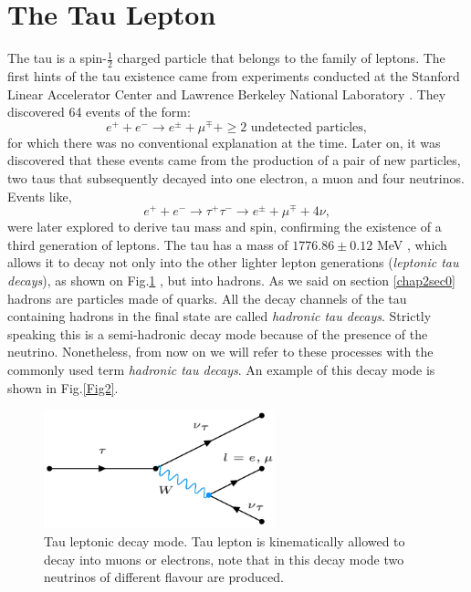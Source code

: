 \section{The Tau Lepton}\label{chap2sec1}
The tau is a spin-$\frac{1}{2}$ charged particle that belongs to the family of leptons. The first hints of the tau existence came from experiments conducted at the Stanford Linear Accelerator Center and Lawrence Berkeley National Laboratory \cite{PhysRevLett.35.1489}. They discovered 64 events of the form:
\begin{equation}
	e^+ + e^- \to e^\pm + \mu^\mp + \geq \text{2 undetected particles},
\end{equation}
for which there was no conventional explanation at the time. Later on, it was discovered that these events came from the production of a pair of new particles, two taus that subsequently decayed into one electron, a muon and four neutrinos. Events like,
\begin{equation}
e^+ + e^- \to \tau^+ \tau^- \to e^\pm + \mu^\mp + 4\nu,
\end{equation}	
were later explored to derive tau mass and spin, confirming the existence of a third generation of leptons. 
The tau has a mass of $1776.86 \pm 0.12$ MeV \cite{PhysRevD.98.030001}, which allows it to decay not only into the other lighter lepton generations (\textit{leptonic tau decays}), as shown on Fig.\ref{Fig1}  , but into hadrons. As we said on section \ref{chap2sec0} hadrons are particles made of quarks. All the decay channels of the tau containing hadrons in the final state are called \textit{hadronic tau decays}. Strictly speaking this is a semi-hadronic decay mode because of the presence of the neutrino. Nonetheless, from now on we will refer to these processes with the commonly used term \textit{hadronic tau decays}. An example of this decay mode is shown in Fig.\ref{Fig2}.
\begin{figure}[h]
	\centering
	\includegraphics[width=0.6\textwidth]{figures/Fig1}
	\caption{Tau leptonic decay mode. Tau lepton is kinematically allowed to decay into muons or electrons, note that in this decay mode two neutrinos of different flavour are produced.}
	\label{Fig1}
\end{figure}
